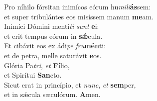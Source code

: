 \oddverse Pro níhilo fórsitan inimícos eórum hu\textit{mi}\textit{li}\textbf{ás}sem:~\*\\
\oddverse et super tribulántes eos misíssem manum \textbf{me}am.\\
\evenverse Inimíci Dómini mentí\textit{ti} \textit{sunt} \textbf{e}i:~\*\\
\evenverse et erit tempus eórum in \textbf{sǽ}cula.\\
\oddverse Et cibávit eos ex ádi\textit{pe} \textit{fru}\textbf{mén}ti:~\*\\
\oddverse et de petra, melle saturávit \textbf{e}os.\\
\evenverse Glória Pa\textit{tri}, \textit{et} \textbf{Fí}lio,~\*\\
\evenverse et Spirítui \textbf{San}cto.\\
\oddverse Sicut erat in princípio, et \textit{nunc}, \textit{et} \textbf{sem}per,~\*\\
\oddverse et in sǽcula sæculórum. \textbf{A}men.\\
